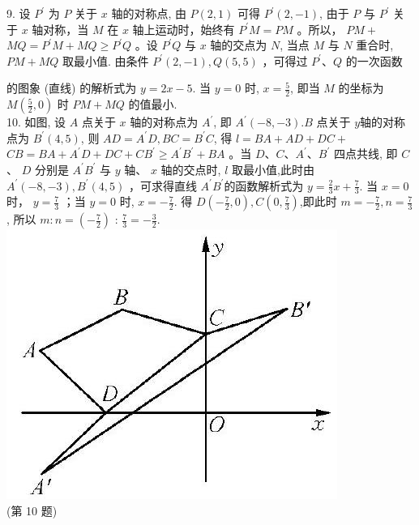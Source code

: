 \documentclass[10pt]{article}
\begin{document}
9. 设 $P^{\prime}$ 为 $P$ 关于 $x$ 轴的对称点, 由 $P(2,1)$ 可得 $P^{\prime}(2,-1)$, 由于 $P$ 与 $P^{\prime}$ 关于 $x$ 轴对称，当 $M$ 在 $x$ 轴上运动时，始终有 $P^{\prime} M=P M$ 。所以， $P M+$ $M Q=P^{\prime} M+M Q \geqslant P^{\prime} Q$ 。设 $P^{\prime} Q$ 与 $x$ 轴的交点为 $N$, 当点 $M$ 与 $N$ 重合时, $P M+M Q$ 取最小值. 由条件 $P^{\prime}(2,-1), Q(5,5)$ ，可得过 $P^{\prime} 、 Q$ 的一次函数

的图象 (直线) 的解析式为 $y=2 x-5$. 当 $y=0$ 时, $x=\frac{5}{2}$, 即当 $M$ 的坐标为 $M\left(\frac{5}{2}, 0\right)$ 时 $P M+M Q$ 的值最小.\\
10. 如图, 设 $A$ 点关于 $x$ 轴的对称点为 $A^{\prime}$, 即 $A^{\prime}(-8,-3) . B$ 点关于 $y$轴的对称点为 $B^{\prime}(4,5)$, 则 $A D=A^{\prime} D, B C=B^{\prime} C$, 得 $l=B A+A D+D C+$ $C B=B A+A^{\prime} D+D C+C B^{\prime} \geqslant A^{\prime} B^{\prime}+B A$ 。当 $D 、 C 、 A^{\prime} 、 B^{\prime}$ 四点共线, 即 $C$ 、 $D$ 分别是 $A^{\prime} B^{\prime}$ 与 $y$ 轴、 $x$ 轴的交点时, $l$ 取最小值,此时由 $A^{\prime}(-8,-3), B^{\prime}(4,5)$ ，可求得直线 $A^{\prime} B^{\prime}$的函数解析式为 $y=\frac{2}{3} x+\frac{7}{3}$. 当 $x=0$ 时， $y=\frac{7}{3}$ ；当 $y=0$ 时, $x=-\frac{7}{2}$. 得 $D\left(-\frac{7}{2}, 0\right), C\left(0, \frac{7}{3}\right)$,即此时 $m=-\frac{7}{2}, n=\frac{7}{3}$, 所以 $m: n=\left(-\frac{7}{2}\right)$ : $\frac{7}{3}=-\frac{3}{2}$.\\
\includegraphics[max width=\textwidth, center]{2024_10_30_1bf34f7aeb61f11d11d3g-109(1)}\\
(第 10 题)\\
\end{document}

